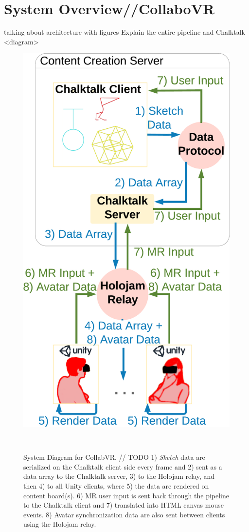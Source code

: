 \documentclass{sigchi}
\begin{document}

\section{System Overview//CollaboVR}
talking about architecture with figures
Explain the entire pipeline and Chalktalk
<diagram> 

\begin{figure}[t]
 \centering
 \includegraphics[width=0.75\columnwidth]{dataflow}
 \caption{System Diagram for CollabVR. 
 // TODO
 1) \textit{Sketch} data are serialized on the Chalktalk client side every frame and 2) sent as a data array to the Chalktalk server, 3) to the Holojam relay, and then 4) to all Unity clients, where 5) the data are rendered on content board(s). 6) MR user input is sent back through the pipeline to the Chalktalk client and 7) translated into HTML canvas mouse events. 8) Avatar synchronization data are also sent between clients using the Holojam relay.}~\label{fig:datapipeline}
\end{figure}
\end{document}
